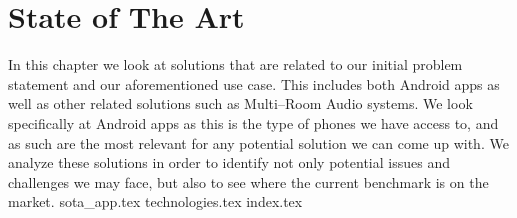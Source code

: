 \chapter{State of The Art}\label{cha:sota}
In this chapter we look at solutions that are related to our initial problem statement and our aforementioned use case.
This includes both Android apps as well as other related solutions such as Multi--Room Audio systems.
We look specifically at Android apps as this is the type of phones we have access to, and as such are the most relevant for any potential solution we can come up with.
We analyze these solutions in order to identify not only potential issues and challenges we may face, but also to see where the current benchmark is on the market.
{sota_app.tex}
{technologies.tex}
{index.tex}
